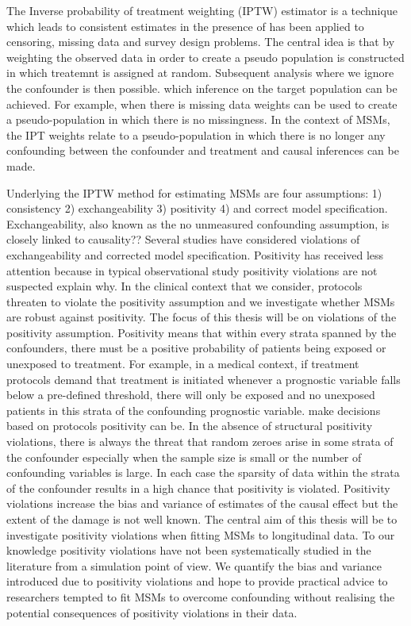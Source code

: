 \documentclass[11pt]{article}
\begin{document}
The Inverse probability of treatment weighting (IPTW) estimator is a
technique which leads to consistent estimates in the presence of has
been applied to censoring, missing data and survey design problems. The
central idea is that by weighting the observed data in order to create a
pseudo population is constructed in which treatemnt is assigned at
random. Subsequent analysis where we ignore the confounder is then
possible. which inference on the target population can be achieved. For
example, when there is missing data weights can be used to create a
pseudo-population in which there is no missingness. In the context of
MSMs, the IPT weights relate to a pseudo-population in which there is no
longer any confounding between the confounder and treatment and causal
inferences can be made.

Underlying the IPTW method for estimating MSMs are four assumptions: 1)
consistency 2) exchangeability 3) positivity 4) and correct model
specification. Exchangeability, also known as the no unmeasured
confounding assumption, is closely linked to causality?? Several studies
have considered violations of exchangeability and corrected model
specification. Positivity has received less attention because in typical
observational study positivity violations are not suspected explain why.
In the clinical context that we consider, protocols threaten to violate
the positivity assumption and we investigate whether MSMs are robust
against positivity. The focus of this thesis will be on violations of
the positivity assumption. Positivity means that within every strata
spanned by the confounders, there must be a positive probability of
patients being exposed or unexposed to treatment. For example, in a
medical context, if treatment protocols demand that treatment is
initiated whenever a prognostic variable falls below a pre-defined
threshold, there will only be exposed and no unexposed patients in this
strata of the confounding prognostic variable. make decisions based on
protocols positivity can be. In the absence of structural positivity
violations, there is always the threat that random zeroes arise in some
strata of the confounder especially when the sample size is small or the
number of confounding variables is large. In each case the sparsity of
data within the strata of the confounder results in a high chance that
positivity is violated. Positivity violations increase the bias and
variance of estimates of the causal effect but the extent of the damage
is not well known. The central aim of this thesis will be to investigate
positivity violations when fitting MSMs to longitudinal data. To our
knowledge positivity violations have not been systematically studied in
the literature from a simulation point of view. We quantify the bias and
variance introduced due to positivity violations and hope to provide
practical advice to researchers tempted to fit MSMs to overcome
confounding without realising the potential consequences of positivity
violations in their data.
\end{document}
